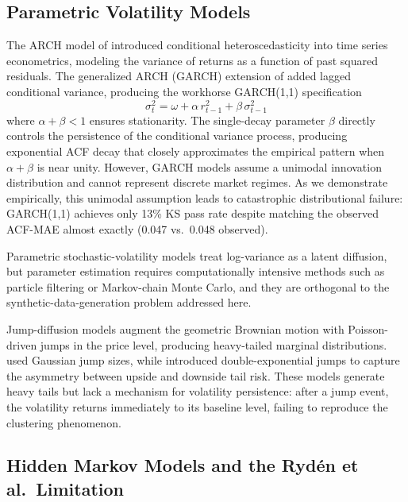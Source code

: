 \subsection{Parametric Volatility Models}

The ARCH model of \citet{engle1982autoregressive} introduced conditional heteroscedasticity into time series econometrics, modeling the variance of returns as a function of past squared residuals.
The generalized ARCH (GARCH) extension of \citet{bollerslev1986generalized} added lagged conditional variance, producing the workhorse GARCH(1,1) specification
\begin{equation}
    \sigma_t^2 = \omega + \alpha\, r_{t-1}^2 + \beta\, \sigma_{t-1}^2
    \label{eq:garch_lit}
\end{equation}
where $\alpha + \beta < 1$ ensures stationarity.
The single-decay parameter $\beta$ directly controls the persistence of the conditional variance process, producing exponential ACF decay that closely approximates the empirical pattern when $\alpha + \beta$ is near unity.
However, GARCH models assume a unimodal innovation distribution and cannot represent discrete market regimes.
As we demonstrate empirically, this unimodal assumption leads to catastrophic distributional failure: GARCH(1,1) achieves only 13\% KS pass rate despite matching the observed ACF-MAE almost exactly (0.047 vs.\ 0.048 observed).

Parametric stochastic-volatility models treat log-variance as a latent diffusion, but parameter estimation requires computationally intensive methods such as particle filtering or Markov-chain Monte Carlo, and they are orthogonal to the synthetic-data-generation problem addressed here.

Jump-diffusion models \cite{merton1976option, kou2002jump} augment the geometric Brownian motion with Poisson-driven jumps in the price level, producing heavy-tailed marginal distributions.
\citet{merton1976option} used Gaussian jump sizes, while \citet{kou2002jump} introduced double-exponential jumps to capture the asymmetry between upside and downside tail risk.
These models generate heavy tails but lack a mechanism for volatility persistence: after a jump event, the volatility returns immediately to its baseline level, failing to reproduce the clustering phenomenon.

\subsection{Hidden Markov Models and the Ryd\'{e}n et al.\ Limitation}

